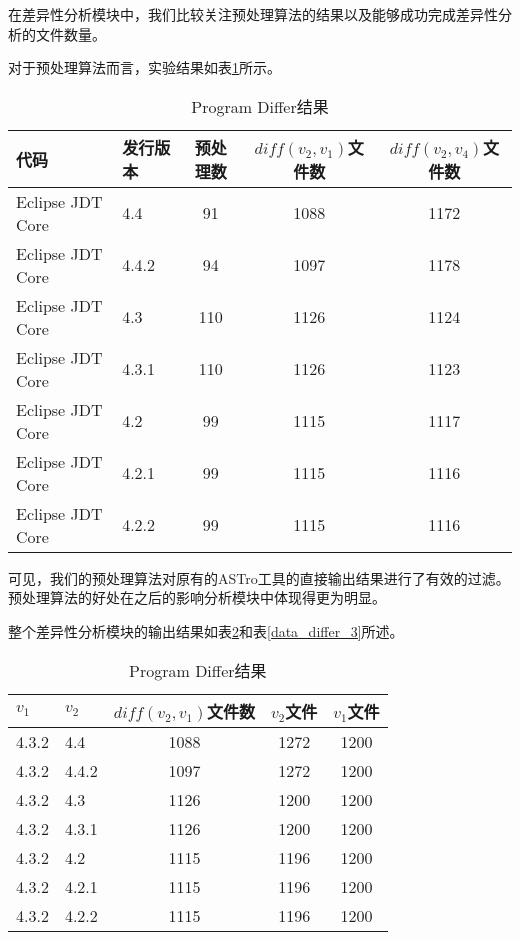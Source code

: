 在差异性分析模块中，我们比较关注预处理算法的结果以及能够成功完成差异性分析的文件数量。

对于预处理算法而言，实验结果如表\ref {data_differ_1}所示。

\begin{table}[H]
	\caption{Program Differ结果}
	\label{data_differ_1}
	\centering
	\begin{tabular}{llccc}
		\toprule[1.5pt]
		{\heiti 代码} & {\heiti 发行版本} & {\heiti 预处理数} & {\heiti $diff(v_2,v_1)$文件数} & {\heiti $diff(v_2,v_4)$文件数} \\\midrule[1pt]
		Eclipse JDT Core & 4.4	& 91 & 1088 & 1172	\\		
		Eclipse JDT Core & 4.4.2 & 94 & 1097 & 1178		\\
		Eclipse JDT Core & 4.3 	& 110 & 1126 & 1124			\\
		Eclipse JDT Core & 4.3.1 & 110 & 1126 & 1123			\\
		Eclipse JDT Core & 4.2 	& 99 & 1115 & 1117		\\
		Eclipse JDT Core & 4.2.1 & 99 & 1115 & 1116			\\
		Eclipse JDT Core & 4.2.2 & 99 & 1115 & 1116		\\
		\bottomrule[1.5pt]
	\end{tabular}
\end{table}

可见，我们的预处理算法对原有的ASTro工具的直接输出结果进行了有效的过滤。预处理算法的好处在之后的影响分析模块中体现得更为明显。

整个差异性分析模块的输出结果如表\ref {data_differ_2}和表\ref {data_differ_3}所述。

\begin{table}[H]
	\caption{Program Differ结果}
	\label{data_differ_2}
	\centering
	\begin{tabular}{llccc}
		\toprule[1.5pt]
		{\heiti $v_1$} & {\heiti $v_2$} & {\heiti $diff(v_2,v_1)$文件数} & {\heiti $v_2$文件} & {\heiti $v_1$文件} \\\midrule[1pt]
		4.3.2 & 4.4	& 1088 & 1272 & 1200\\		
		4.3.2 & 4.4.2 & 1097 & 1272	& 1200	\\
		4.3.2 & 4.3 	 & 1126 & 1200	& 1200		\\
		4.3.2 & 4.3.1  & 1126 & 1200 & 1200			\\
		4.3.2 & 4.2 	& 1115 & 1196 & 1200		\\
		4.3.2 & 4.2.1 & 1115 & 1196 & 1200		\\
		4.3.2 & 4.2.2  & 1115 & 1196 & 1200		\\
		\bottomrule[1.5pt]
	\end{tabular}
\end{table}


